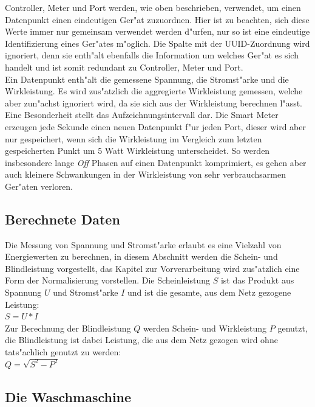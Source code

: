 Controller, Meter und Port werden, wie oben beschrieben, verwendet, um einen Datenpunkt einen eindeutigen Ger"at zuzuordnen. Hier ist zu beachten, sich diese Werte immer nur gemeinsam verwendet werden d"urfen, nur so ist eine eindeutige Identifizierung eines Ger"ates m"oglich.
Die Spalte mit der UUID-Zuordnung wird ignoriert, denn sie enth"alt ebenfalls die Information um welches Ger"at es sich handelt und ist somit redundant zu Controller, Meter und Port. \\
Ein Datenpunkt enth"alt die gemessene Spannung, die Stromst"arke und die Wirkleistung. Es wird zus"atzlich die aggregierte Wirkleistung gemessen, welche aber zun"achst ignoriert wird, da sie sich aus der Wirkleistung berechnen l"asst. \\
Eine Besonderheit stellt das Aufzeichnungsintervall dar. Die Smart Meter erzeugen jede Sekunde einen neuen Datenpunkt f"ur jeden Port, dieser wird aber nur gespeichert, wenn sich die Wirkleistung im Vergleich zum letzten gespeicherten Punkt um 5 Watt Wirkleistung unterscheidet. So werden insbesondere lange \textit{Off} Phasen auf einen Datenpunkt komprimiert, es gehen aber auch kleinere Schwankungen in der Wirkleistung von sehr verbrauchsarmen Ger"aten verloren.


\subsection{Berechnete Daten}
\label{Berechnete Daten}

Die Messung von Spannung und Stromst"arke erlaubt es eine Vielzahl von Energiewerten zu berechnen, in diesem Abschnitt werden die Schein- und Blindleistung vorgestellt, das Kapitel zur Vorverarbeitung wird zus"atzlich eine Form der Normalisierung vorstellen. 
Die Scheinleistung $S$ ist das Produkt aus Spannung $U$ und Stromst"arke $I$ und ist die gesamte, aus dem Netz gezogene Leistung:\\ $S = U * I$\\[0.5cm]
Zur Berechnung der Blindleistung $Q$ werden Schein- und Wirkleistung $P$ genutzt, die Blindleistung ist dabei Leistung, die aus dem Netz gezogen wird ohne tats"achlich genutzt zu werden:\\ $Q = \sqrt{S^2 - P^2}$ \\


\subsection{Die Waschmaschine}
\label{Die Waschmaschine}

